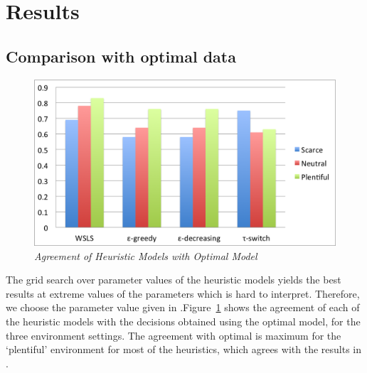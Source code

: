 \section{Results}
\label{results}

\subsection{Comparison with optimal data}

\begin{figure}[H]
\begin{center}
\includegraphics[scale=0.5]{optimalVsHeuristicNoTitle}
\caption{\small \sl \label{plot1} Agreement of Heuristic Models with Optimal Model}
\end{center}
\end{figure}

The grid search over parameter values of the heuristic models yields the best results at extreme values of the parameters which is hard to interpret. Therefore, we choose the parameter value given in \cite{shunan2011}.Figure~\ref{plot1} shows the agreement of each of the heuristic models with the decisions obtained using the optimal model, for the three environment settings. The agreement with optimal is maximum for the `plentiful' environment for most of the heuristics, which agrees with the results in \cite{shunan2011}.

